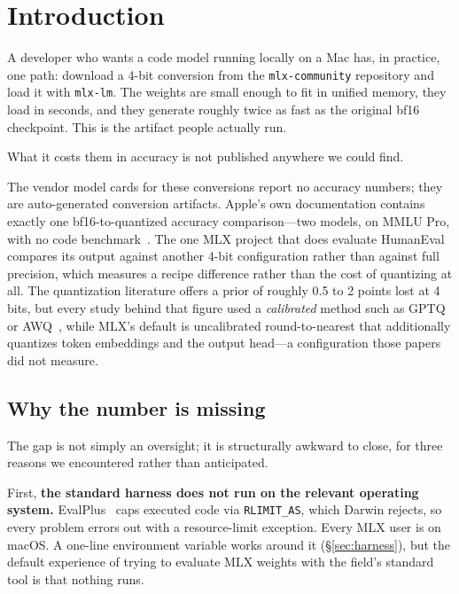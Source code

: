\documentclass[11pt]{article}
\begin{document}
\section{Introduction}
\label{sec:intro}

A developer who wants a code model running locally on a Mac has, in practice, one path:
download a 4-bit conversion from the \texttt{mlx-community} repository and load it with
\texttt{mlx-lm}. The weights are small enough to fit in unified memory, they load in
seconds, and they generate roughly twice as fast as the original bf16 checkpoint. This
is the artifact people actually run.

What it costs them in accuracy is not published anywhere we could find.

The vendor model cards for these conversions report no accuracy numbers; they are
auto-generated conversion artifacts. Apple's own documentation contains exactly one
bf16-to-quantized accuracy comparison---two models, on MMLU Pro, with no code
benchmark~\citep{applebenchmarks}. The one MLX project that does evaluate HumanEval
compares its output against another 4-bit configuration rather than against full
precision, which measures a recipe difference rather than the cost of quantizing at
all. The quantization literature offers a prior of roughly 0.5 to 2 points lost at 4
bits, but every study behind that figure used a \emph{calibrated} method such as
GPTQ~\citep{frantar2023gptq} or AWQ~\citep{lin2024awq}, while MLX's default is
uncalibrated round-to-nearest that additionally quantizes token embeddings and the
output head---a configuration those papers did not measure.

\subsection{Why the number is missing}

The gap is not simply an oversight; it is structurally awkward to close, for three
reasons we encountered rather than anticipated.

First, \textbf{the standard harness does not run on the relevant operating system.}
EvalPlus~\citep{liu2023evalplus} caps executed code via \texttt{RLIMIT\_AS}, which
Darwin rejects, so every problem errors out with a resource-limit exception. Every MLX
user is on macOS. A one-line environment variable works around it
(\S\ref{sec:harness}), but the default experience of trying to evaluate MLX weights
with the field's standard tool is that nothing runs.
\end{document}
